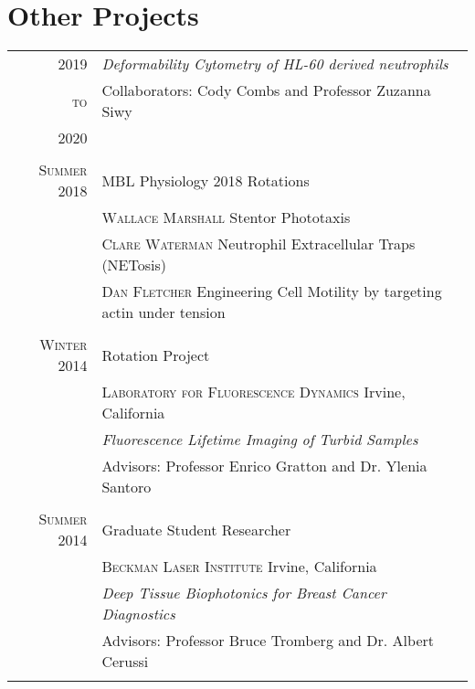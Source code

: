 \documentclass[letterpaper,10pt]{article} %
\begin{document}
\section{Other Projects}
\bigskip

\begin{tabularx}{\textwidth}{r|p{11cm}}

\textsc{2019} & \emph{Deformability Cytometry of HL-60 derived neutrophils} \\
\textsc{to} & Collaborators: Cody Combs and Professor Zuzanna Siwy \\
\textsc{2020} &  \\

\multicolumn{2}{c}{} \\

\textsc{Summer 2018} & MBL Physiology 2018 Rotations\\
& \textsc{Wallace Marshall} Stentor Phototaxis\\
& \textsc{Clare Waterman} Neutrophil Extracellular Traps (NETosis)\\
& \textsc{Dan Fletcher} Engineering Cell Motility by targeting actin under tension \\

\multicolumn{2}{c}{} \\


\textsc{Winter 2014} & Rotation Project \\
& \textsc{Laboratory for Fluorescence Dynamics} Irvine, California\\
&\emph{Fluorescence Lifetime Imaging of Turbid Samples}\\
& Advisors: Professor Enrico Gratton and Dr. Ylenia Santoro \\

\multicolumn{2}{c}{} \\


\textsc{Summer 2014} & Graduate Student Researcher \\
& \textsc{Beckman Laser Institute} Irvine, California\\
&\emph{Deep Tissue Biophotonics for Breast Cancer Diagnostics}\\ 
& Advisors: Professor Bruce Tromberg and Dr. Albert Cerussi \\

\multicolumn{2}{c}{} \\


\end{tabularx}
\end{document}
